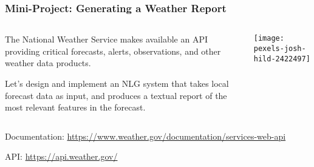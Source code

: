 \begin{frame}
\frametitle{Mini-Project: Generating a Weather Report}

\begin{columns}

	\begin{column}{0.6\textwidth}
		The National Weather Service makes available an API
		providing critical forecasts, alerts, observations,
		and other weather data products.
		
		\vspace{12pt}
		
		Let's design and implement an NLG system
		that takes local forecast data as input,
		and produces a textual report
		of the most relevant features in the forecast.
	\end{column}
	
	\begin{column}{0.4\textwidth}
		\centering
		\texttt{[image: pexels-josh-hild-2422497]}
	\end{column}

\end{columns}

\vspace{12pt}

Documentation: \href{https://www.weather.gov/documentation/services-web-api}{https://www.weather.gov/documentation/services-web-api}

API: \href{https://api.weather.gov/}{https://api.weather.gov/}


\end{frame}